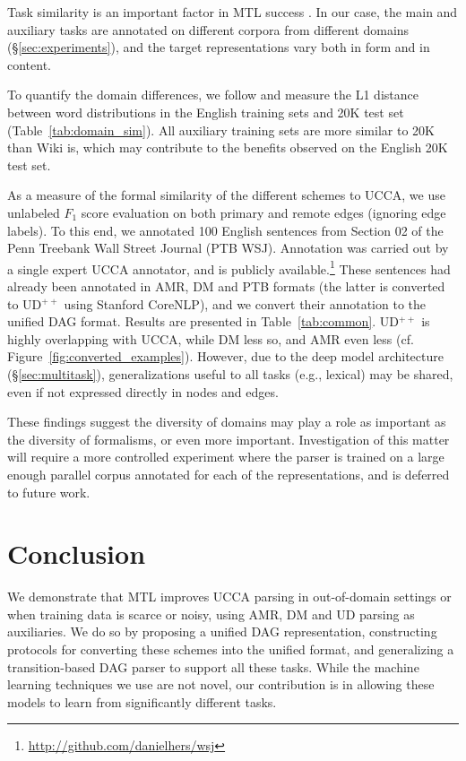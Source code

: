 \documentclass[11pt,a4paper]{article}
\begin{document}
Task similarity is an important factor in MTL success
\cite{E17-2026,E17-1005}.
In our case, the main and auxiliary tasks are annotated on different corpora
from different domains (\S\ref{sec:experiments}), and
the target representations vary both in form and in content.

To quantify the domain differences, we follow \citet{Plank2011EffectiveMO} and measure the L1 distance 
between word distributions in the English training sets and 20K test set
(Table~\ref{tab:domain_sim}).
All auxiliary training sets are more similar to 20K than Wiki is, which may
contribute to the benefits observed on the English 20K test set.

As a measure of the formal similarity of the different schemes to UCCA,
we use unlabeled $F_1$ score evaluation on both primary and remote edges (ignoring edge labels).
To this end, we annotated 100 English sentences from Section 02 of the Penn Treebank Wall Street Journal
(PTB WSJ).
Annotation was carried out by a single expert UCCA annotator,
and is publicly available.\footnote{\url{http://github.com/danielhers/wsj}}
These sentences had already been annotated in AMR, DM and PTB formats
(the latter is converted to UD$^{++}$ using Stanford CoreNLP),
and we convert their annotation to the unified DAG format.
Results are presented in Table~\ref{tab:common}.
UD$^{++}$ is highly overlapping with UCCA, while DM less so, and AMR even less
(cf. Figure~\ref{fig:converted_examples}).
However, due to the deep model architecture (\S\ref{sec:multitask}),
generalizations useful to all tasks (e.g., lexical) may be shared,
even if not expressed directly in nodes and edges.

These findings suggest the diversity of domains may play a role
as important as the diversity of formalisms, or even more important.
Investigation of this matter will require a more controlled experiment
where the parser is trained on a large enough parallel corpus annotated
for each of the representations, and is deferred to future work.


\section{Conclusion}\label{sec:conclusion}

We demonstrate that MTL improves UCCA parsing in out-of-domain settings
or when training data is scarce or noisy,
using AMR, DM and UD parsing as auxiliaries.
We do so by proposing a unified DAG representation,
constructing protocols for converting these schemes into the unified format,
and generalizing a transition-based DAG parser to support all these tasks.
While the machine learning techniques we use are not novel,
our contribution is in allowing these models to learn from
significantly different tasks.
\end{document}
